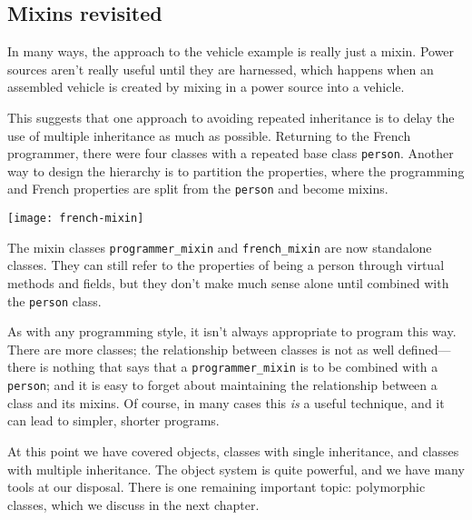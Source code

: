 \subsection{Mixins revisited}

In many ways, the approach to the vehicle example is really just a mixin.  Power sources aren't
really useful until they are harnessed, which happens when an assembled vehicle is created by mixing
in a power source into a vehicle.

This suggests that one approach to avoiding repeated inheritance is to delay the use of multiple
inheritance as much as possible.  Returning to the French programmer, there were four classes with a
repeated base class \hbox{\lstinline/person/}.  Another way to design the hierarchy is to partition the
properties, where the programming and French properties are split from the \hbox{\lstinline/person/} and
become mixins.

\begin{center}
\texttt{[image: french-mixin]}
\end{center}
%
The mixin classes \hbox{\lstinline/programmer_mixin/} and \hbox{\lstinline/french_mixin/} are now standalone
classes.  They can still refer to the properties of being a person through virtual methods and fields, but they
don't make much sense alone until combined with the \hbox{\lstinline/person/} class.

As with any programming style, it isn't always appropriate to program this way.  There are more
classes; the relationship between classes is not as well defined---there is nothing that says that
a \hbox{\lstinline/programmer_mixin/} is to be combined with a \hbox{\lstinline/person/}; and it is easy to forget
about maintaining the relationship between a class and its mixins.  Of course, in many cases
this \emph{is} a useful technique, and it can lead to simpler, shorter programs.

At this point we have covered objects, classes with single inheritance, and classes with multiple
inheritance.  The object system is quite powerful, and we have many tools at our disposal.  There is
one remaining important topic: polymorphic classes, which we discuss in the next chapter.

